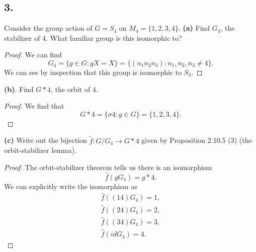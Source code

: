 \documentclass{article}
\newenvironment{hwproof}[1]
{
    #1
    \begin{proof}
}{
    \end{proof}
}
\begin{document}
\subsection*{3.}
\begin{hwproof}
    {
        Consider the group action of $G=S_4$ on $M_4 = \{1,2,3,4\}$.
        \textbf{(a)} Find $G_4$, the stabilizer of 4. What familiar group is this
        isomorphic to?
    }
    We can find
    \begin{equation*}
        G_4 = \{g \in G : gX = X\} = \{(n_1 n_2 n_3) : n_1, n_2, n_3 \neq 4\}.
    \end{equation*}
    We can see by inspection that this group is isomorphic to $S_3$.
\end{hwproof}

\begin{hwproof}
    {
        \textbf{(b)}. Find $G*4$, the orbit of 4.
    }
    We find that
    \begin{equation*}
        G*4 = \{\sigma 4 : g \in G\} = \{1,2,3,4\}.
    \end{equation*}
\end{hwproof}

\begin{hwproof}
    {
        \textbf{(c)} Write out the bijection $\tilde{f}: G / G_4 \to G*4$ given
        by Proposition 2.10.5 (3) (the orbit-stabilizer lemma).
    }
    The orbit-stabilizer theorem tells us there is an isomorphism
    \begin{equation*}
        \hat{f}(gG_4) = g*4.
    \end{equation*}
    We can explicitly write the isomorphism as
    \begin{gather*}
        \hat{f}((1 4)G_4) = 1,\\
        \hat{f}((2 4)G_4) = 2,\\
        \hat{f}((3 4)G_4) = 3,\\
        \hat{f}(idG_4) = 4.
    \end{gather*}

\end{hwproof}
\end{document}
